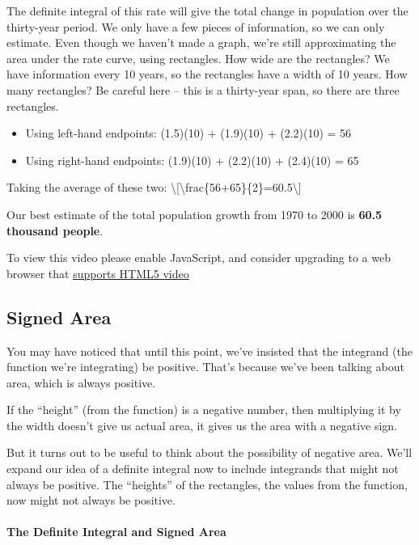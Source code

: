 The definite integral of this rate will give the total change in
population over the thirty-year period. We only have a few pieces of
information, so we can only estimate. Even though we haven't made a
graph, we're still approximating the area under the rate curve, using
rectangles. How wide are the rectangles? We have information every 10
years, so the rectangles have a width of 10 years. How many rectangles?
Be careful here -- this is a thirty-year span, so there are three
rectangles.

\begin{itemize}
\tightlist
\item
  Using left-hand endpoints: (1.5)(10) + (1.9)(10) + (2.2)(10) = 56
\item
  Using right-hand endpoints: (1.9)(10) + (2.2)(10) + (2.4)(10) = 65
\end{itemize}

Taking the average of these two:
\textbackslash{}{[}\textbackslash{}frac\{56+65\}\{2\}=60.5\textbackslash{}{]}

Our best estimate of the total population growth from 1970 to 2000 is
\textbf{60.5 thousand people}.

To view this video please enable JavaScript, and consider upgrading to a
web browser that \href{http://videojs.com/html5-video-support/}{supports
HTML5 video}

\hypertarget{signed-area}{%
\subsection{Signed Area}\label{signed-area}}

You may have noticed that until this point, we've insisted that the
integrand (the function we're integrating) be positive. That's because
we've been talking about area, which is always positive.

If the ``height'' (from the function) is a negative number, then
multiplying it by the width doesn't give us actual area, it gives us the
area with a negative sign.

But it turns out to be useful to think about the possibility of negative
area. We'll expand our idea of a definite integral now to include
integrands that might not always be positive. The ``heights'' of the
rectangles, the values from the function, now might not always be
positive.

\hypertarget{the-definite-integral-and-signed-area}{%
\paragraph{The Definite Integral and Signed
Area}\label{the-definite-integral-and-signed-area}}


